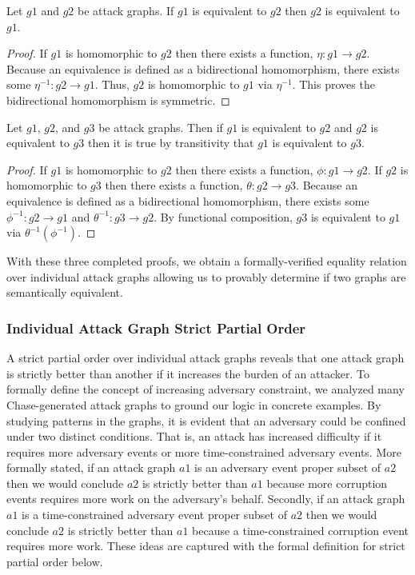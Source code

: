 \documentclass[runningheads]{llncs}
\theoremstyle{definition}
\begin{document}
\begin{theorem}
    Let $g1$ and $g2$ be attack graphs. If $g1$ is equivalent to $g2$ then $g2$ is equivalent to $g1$. 
\end{theorem}
\begin{proof}
    If $g1$ is homomorphic to $g2$ then there exists a function, $\eta : g1 \to g2$. Because an equivalence is defined as a bidirectional homomorphism, there exists some $\eta^{-1} : g2 \to g1$. Thus, $g2$ is homomorphic to $g1$ via $\eta^{-1}$. This proves the bidirectional homomorphism is symmetric. 
\end{proof}

\begin{theorem}
    Let $g1$, $g2$, and $g3$ be attack graphs. Then if $g1$ is equivalent to $g2$ and $g2$ is equivalent to $g3$ then it is true by transitivity that $g1$ is equivalent to $g3$.   
\end{theorem}
\begin{proof}
    If $g1$ is homomorphic to $g2$ then there exists a function, $\phi : g1 \to g2$. If $g2$ is homomorphic to $g3$ then there exists a function, $\theta : g2 \to g3$. Because an equivalence is defined as a bidirectional homomorphism, there exists some $\phi^{-1} : g2 \to g1$ and $\theta^{-1} : g3 \to g2$. By functional composition, $g3$ is equivalent to $g1$ via $\theta^{-1} (\phi^{-1}).$
\end{proof}

\noindent With these three completed proofs, we obtain a formally-verified equality relation over individual attack graphs allowing us to provably determine if two graphs are semantically equivalent.

\subsubsection*{Individual Attack Graph Strict Partial Order}

A strict partial order over individual attack graphs reveals that one attack graph is strictly better than another if it increases the burden of an attacker. To formally define the concept of increasing adversary constraint, we analyzed many Chase-generated attack graphs to ground our logic in concrete examples. By studying patterns in the graphs, it is evident that an adversary could be confined under two distinct conditions. That is, an attack has increased difficulty if it requires more adversary events or more time-constrained adversary events. More formally stated, if an attack graph $a1$ is an adversary event proper subset of $a2$ then we would conclude $a2$ is strictly better than $a1$ because more corruption events requires more work on the adversary's behalf. Secondly, if an attack graph $a1$ is a time-constrained adversary event proper subset of $a2$ then we would conclude $a2$ is strictly better than $a1$ because a time-constrained corruption event requires more work. These ideas are captured with the formal definition for strict partial order below.
\end{document}
